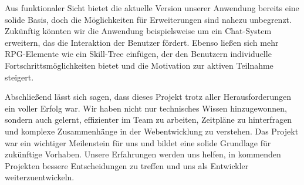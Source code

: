 \documentclass[a4paper,12pt]{article}
\begin{document}
Aus funktionaler Sicht bietet die aktuelle Version unserer Anwendung bereits eine solide Basis, doch die Möglichkeiten für Erweiterungen sind nahezu unbegrenzt. Zukünftig könnten wir die Anwendung beispielsweise um ein Chat-System erweitern, das die Interaktion der Benutzer fördert. Ebenso ließen sich mehr RPG-Elemente wie ein Skill-Tree einfügen, der den Benutzern individuelle Fortschrittsmöglichkeiten bietet und die Motivation zur aktiven Teilnahme steigert.

Abschließend lässt sich sagen, dass dieses Projekt trotz aller Herausforderungen ein voller Erfolg war. Wir haben nicht nur technisches Wissen hinzugewonnen, sondern auch gelernt, effizienter im Team zu arbeiten, Zeitpläne zu hinterfragen und komplexe Zusammenhänge in der Webentwicklung zu verstehen. Das Projekt war ein wichtiger Meilenstein für uns und bildet eine solide Grundlage für zukünftige Vorhaben. Unsere Erfahrungen werden uns helfen, in kommenden Projekten bessere Entscheidungen zu treffen und uns als Entwickler weiterzuentwickeln.

\newpage
\printbibliography
\end{document}
